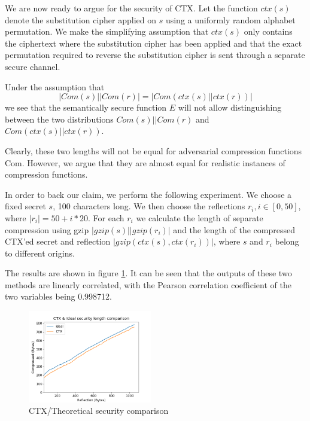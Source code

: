 We are now ready to argue for the security of CTX. Let the function $ctx(s)$
denote the substitution cipher applied on $s$ using a uniformly random alphabet
permutation. We make the simplifying assumption that $ctx(s)$ only contains the
ciphertext where the substitution cipher has been applied and that the exact
permutation required to reverse the substitution cipher is sent through a
separate secure channel.

Under the assumption that \[|Com(s) || Com(r)| = |Com(ctx(s) || ctx(r))|\] we
see that the semantically secure function $E$ will not allow distinguishing
between the two distributions $Com(s) || Com(r)$ and $Com(ctx(s) || ctx(r))$.

Clearly, these two lengths will not be equal for adversarial compression
functions Com. However, we argue that they are almost equal for realistic
instances of compression functions.

In order to back our claim, we perform the following experiment. We choose a
fixed secret $s$, 100 characters long. We then choose the reflections $r_i,
i\in[0, 50]$, where $|r_i| = 50 + i*20$. For each $r_i$ we calculate the
length of separate compression using gzip $|gzip(s)||gzip(r_i)|$ and the length
of the compressed CTX'ed secret and reflection $|gzip(ctx(s), ctx(r_i))|$, where $s$
and $r_i$ belong to different origins.

The results are shown in figure \ref{fig:defense_experiment}. It can be seen
that the outputs of these two methods are linearly correlated, with the
Pearson correlation coefficient of the two variables being 0.998712.

    \begin{figure}[thpb]
        \centering
            \includegraphics[width=0.48\textwidth]{experiments/ctx_idealness/ctx_experiment.png}
        \caption{CTX/Theoretical security comparison}
        \label{fig:defense_experiment}
    \end{figure}

